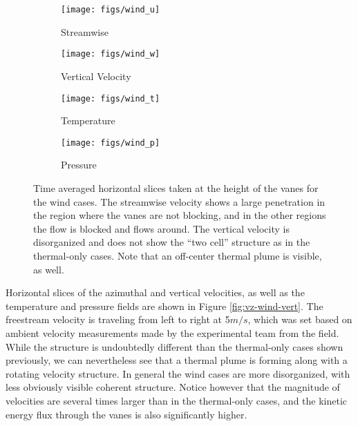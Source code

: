 %
%
\begin{figure}[htb]

 \begin{subfigure}{.5\textwidth}
  \centering
  \texttt{[image: figs/wind\_u]}
  \caption{Streamwise}
  \label{fig:vt-wind}
 \end{subfigure}%
 \begin{subfigure}{.5\textwidth}
  \centering
  \texttt{[image: figs/wind\_w]}
  \caption{Vertical Velocity}
  \label{fig:vz-wind}
 \end{subfigure}%


 \begin{subfigure}{.5\textwidth}
  \centering
  \texttt{[image: figs/wind\_t]}
  \caption{Temperature}
  \label{fig:t-wind}
 \end{subfigure}%
 \begin{subfigure}{.5\textwidth}
  \centering
  \texttt{[image: figs/wind\_p]}
  \caption{Pressure}
  \label{fig:p-wind}
 \end{subfigure}%

 \caption{Time averaged horizontal slices taken at the height of the
 vanes for the wind cases. The streamwise velocity shows a large
 penetration in the region where the vanes are not blocking, and in the
 other regions the flow is blocked and flows around. The vertical
 velocity is disorganized and does not show the ``two cell'' structure
 as in the thermal-only cases.  Note that an
 off-center thermal plume is visible, as well.  } 
 \label{fig:wind-hor}
\end{figure}


Horizontal slices of the azimuthal and vertical velocities, as well as the 
temperature and pressure fields are shown in Figure
\ref{fig:vz-wind-vert}. The freestream velocity is traveling from left
to right at 5$ m/s$, which was set based on ambient velocity
measurements made by  the experimental team from the field. While the
structure is undoubtedly different than the thermal-only cases shown
previously, we can nevertheless see that a thermal plume is forming
along with a rotating velocity structure. In general the wind cases are
more disorganized, with less obviously visible coherent
structure. Notice however that the magnitude of velocities are several
times larger than in the thermal-only cases, and the kinetic energy
flux through the vanes is also significantly higher.  

%
%

